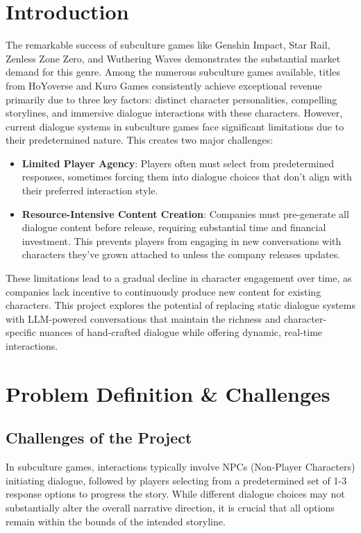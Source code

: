 \documentclass{article}
\begin{document}
\section{Introduction}
The remarkable success of subculture games like Genshin Impact, Star Rail, Zenless Zone Zero, and Wuthering Waves demonstrates the substantial market demand for this genre. Among the numerous subculture games available, titles from HoYoverse and Kuro Games consistently achieve exceptional revenue primarily due to three key factors: distinct character personalities, compelling storylines, and immersive dialogue interactions with these characters.
However, current dialogue systems in subculture games face significant limitations due to their predetermined nature. This creates two major challenges:
\begin{itemize}
\item \textbf{Limited Player Agency}: Players often must select from predetermined responses, sometimes forcing them into dialogue choices that don't align with their preferred interaction style.
\item \textbf{Resource-Intensive Content Creation}: Companies must pre-generate all dialogue content before release, requiring substantial time and financial investment. This prevents players from engaging in new conversations with characters they've grown attached to unless the company releases updates.
\end{itemize}
These limitations lead to a gradual decline in character engagement over time, as companies lack incentive to continuously produce new content for existing characters. This project explores the potential of replacing static dialogue systems with LLM-powered conversations that maintain the richness and character-specific nuances of hand-crafted dialogue while offering dynamic, real-time interactions.



\section{Problem Definition \& Challenges}
\subsection{Challenges of the Project}
In subculture games, interactions typically involve NPCs (Non-Player Characters) initiating dialogue, followed by players selecting from a predetermined set of 1-3 response options to progress the story. While different dialogue choices may not substantially alter the overall narrative direction, it is crucial that all options remain within the bounds of the intended storyline.
\end{document}

